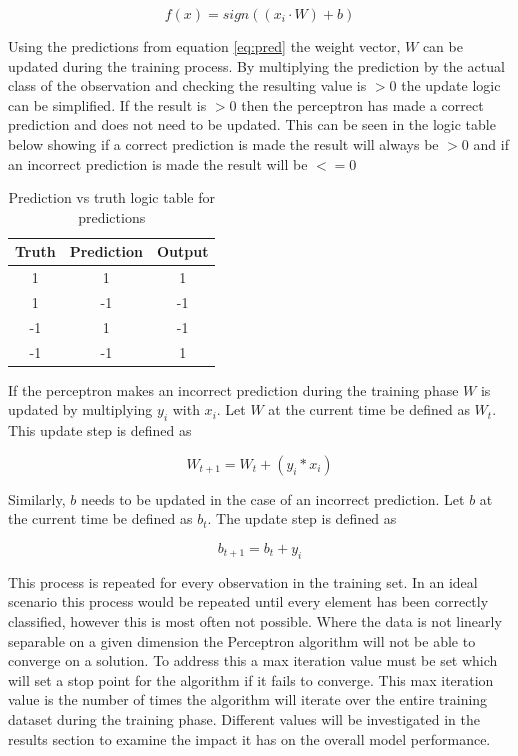 \documentclass[10pt,twocolumn,letterpaper]{article}
\begin{document}
\begin{equation}\label{eq:pred}
   f(x) = sign((x_i \cdot W) + b)
\end{equation}

Using the predictions from equation \eqref{eq:pred} the weight vector, $W$ can be updated during the training process.
By multiplying the prediction by the actual class of the observation and checking the resulting value is $>0$
the update logic can be simplified. If the result is $>0$ then the perceptron has made a correct prediction
and does not need to be updated. This can be seen in the logic table below showing if a correct
prediction is made the result will always be $>0$ and if an incorrect prediction is made the result will be
$<=0$
\begin{table}[h!]
   \centering
   \begin{tabular}{ ||c c c|| }
      \hline
      Truth & Prediction & Output \\
      \hline
      1     & 1          & 1      \\
      \hline
      1     & -1         & -1     \\
      \hline
      -1    & 1          & -1     \\
      \hline
      -1    & -1         & 1      \\
      \hline
   \end{tabular}      \label{tab:logic}
   \caption{Prediction vs truth logic table for predictions}
\end{table}

If the perceptron makes an incorrect prediction during the training phase $W$ is updated by multiplying
$y_i$ with $x_i$. Let $W$ at the current time be defined as $W_t$. This update step is defined as

\begin{equation}\label{eq:updateweight}
   W_{t+1} = W_t + (y_i * x_i)
\end{equation}

Similarly, $b$ needs to be updated in the case of an incorrect prediction. Let $b$ at the current time
be defined as $b_t$. The update step is defined as

\begin{equation}\label{eq:updatebias}
   b_{t+1} = b_t + y_i
\end{equation}

This process is repeated for every observation in the training set. In an ideal scenario this process would
be repeated until every element has been correctly classified, however this is most often not possible. Where
the data is not linearly separable on a given dimension the Perceptron algorithm will not be able to converge
on a solution. To address this a max iteration value must be set which will set a stop point for the algorithm
if it fails to converge. This max iteration value is the number of times the algorithm will iterate over the
entire training dataset during the training phase. Different values will be investigated in the results section
to examine the impact it has on the overall model performance.
\end{document}
